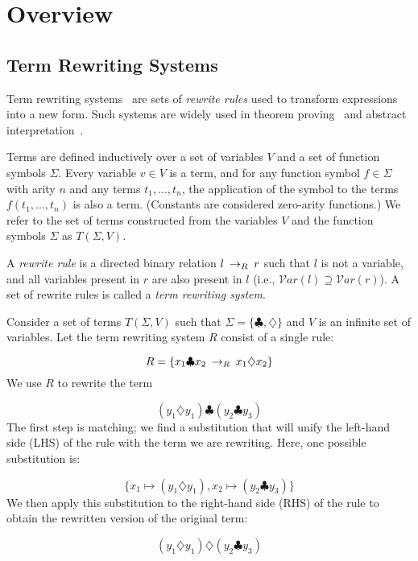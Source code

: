 \chapter{Overview}
\label{sec:overview}

\section{Term Rewriting Systems}

Term rewriting systems~\cite{gorn1967} are sets of \textit{rewrite rules} used to transform expressions into a new form.  Such systems are widely
used in theorem proving~\cite{baader1999term} and abstract interpretation~\cite{cousot1977abstract, cousot1979systematic}.

Terms are defined inductively over a set of variables $V$ and a set of function symbols $\Sigma$. Every variable $v \in V$ is a term, and for any function symbol $f \in \Sigma$ with arity $n$ and any terms $t_1, ..., t_n$, the application of the symbol to the terms $f(t_1, ..., t_n)$ is also a term. (Constants are considered zero-arity functions.) We refer to the set of terms constructed from the variables $V$ and the function symbols $\Sigma$ as $T(\Sigma, V)$.

A \emph{rewrite rule} is a directed binary relation $l \:\rightarrow_{R}\: r$ such that $l$ is not a variable, and all variables present in $r$ are also present in $l$ (i.e., $\mathcal{V}ar(l) \supseteq \mathcal{V}ar(r)$). A set of rewrite rules is called a \emph{term rewriting system}.

Consider a set of terms $T(\Sigma, V)$ such that $\Sigma = \{\clubsuit, \diamondsuit\}$ and $V$ is an infinite set of variables. Let the term rewriting system $R$ consist of a single rule:

\[ R = \{ x_1 \clubsuit x_2 \:\rightarrow_{R}\: x_1 \diamondsuit x_2 \} \]
We use $R$ to rewrite the term

\[ 
(y_1 \diamondsuit y_1) \clubsuit (y_2 \clubsuit y_3)
\]
The first step is matching; we find a substitution that will unify the left-hand side (LHS) of the rule with the term we are rewriting. Here, one possible substitution is:

\[
\{ x_1 \mapsto (y_1 \diamondsuit y_1), x_2 \mapsto (y_2 \clubsuit y_3) \}
\]
We then apply this substitution to the right-hand side (RHS) of the rule to obtain the rewritten version of the original term:

\[ 
(y_1 \diamondsuit y_1) \diamondsuit (y_2 \clubsuit y_3)
\]


